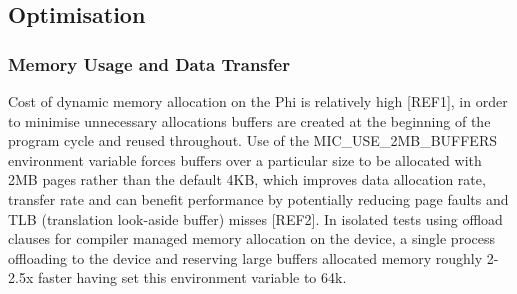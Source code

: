 \documentclass[runningheads,a4paper]{llncs}
\begin{document}




\subsection{Optimisation}
\label{sect:micoptimisation}


\subsubsection{Memory Usage and Data Transfer}
\label{sect:memusage}

Cost of dynamic memory allocation on the Phi is relatively high [REF1], in order to minimise unnecessary allocations 
buffers are created at the beginning of the program cycle and reused throughout. Use of the MIC\_USE\_2MB\_BUFFERS 
environment variable forces buffers over a particular size to be allocated with 2MB pages rather than the default 4KB, 
which improves data allocation rate, transfer rate and can benefit performance by potentially reducing page 
faults and TLB (translation look-aside buffer) misses [REF2]. In isolated tests using offload clauses for compiler 
managed memory allocation on the device, a single process offloading to the device and reserving large buffers allocated 
memory roughly 2-2.5x faster having set this environment variable to 64k.
\end{document}
